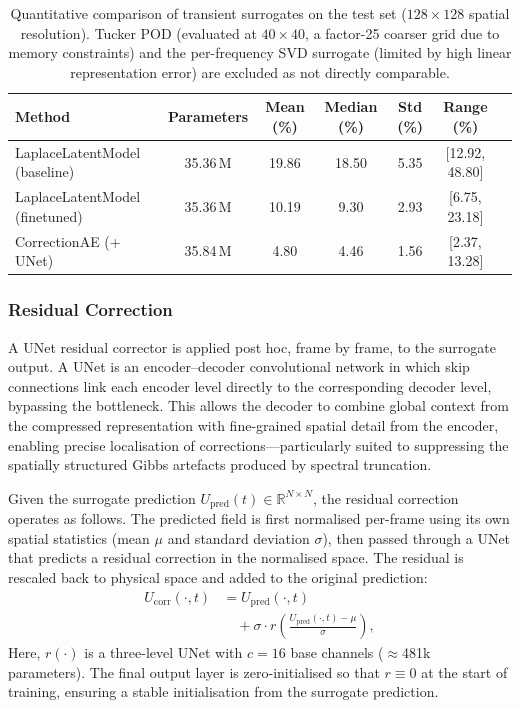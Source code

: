 \documentclass[a4paper, twocolumn]{article}
\newcommand{\R}{\mathbb{R}}
\begin{document}
\begin{table}[htbp]
    \centering
    \begin{tabular}{lcccccc}
        \toprule
        \textbf{Method} & \textbf{Parameters} & \textbf{Mean (\%)} & \textbf{Median (\%)} & \textbf{Std (\%)} & \textbf{Range (\%)} \\
        \midrule
        LaplaceLatentModel (baseline)     & 35.36\,M & 19.86 & 18.50 & 5.35 & [12.92, 48.80] \\
        LaplaceLatentModel (finetuned)    & 35.36\,M & 10.19 & 9.30  & 2.93 & [6.75, 23.18] \\
        CorrectionAE (+ UNet)             & 35.84\,M & 4.80  & 4.46  & 1.56 & [2.37, 13.28] \\
        \bottomrule
    \end{tabular}
    \caption{Quantitative comparison of transient surrogates on the test set ($128\times128$ spatial resolution). Tucker POD (evaluated at $40\times40$, a factor-25 coarser grid due to memory constraints) and the per-frequency SVD surrogate (limited by high linear representation error) are excluded as not directly comparable.}
    \label{tab:comparison}
\end{table}

\subsubsection{Residual Correction}

A UNet \cite{ronneberger2015unet} residual corrector is applied post hoc, frame by frame, to the surrogate output. A UNet is an encoder--decoder convolutional network in which skip connections link each encoder level directly to the corresponding decoder level, bypassing the bottleneck. This allows the decoder to combine global context from the compressed representation with fine-grained spatial detail from the encoder, enabling precise localisation of corrections—particularly suited to suppressing the spatially structured Gibbs artefacts produced by spectral truncation.

Given the surrogate prediction $U_{\mathrm{pred}}(t) \in \R^{N \times N}$, the residual correction operates as follows. The predicted field is first normalised per-frame using its own spatial statistics (mean $\mu$ and standard deviation $\sigma$), then passed through a UNet that predicts a residual correction in the normalised space. The residual is rescaled back to physical space and added to the original prediction:
\begin{equation}
\begin{split}
    U_{\mathrm{corr}}(\cdot,t) &= U_{\mathrm{pred}}(\cdot,t) \\
    &\quad + \sigma \cdot r\!\left(\frac{U_{\mathrm{pred}}(\cdot,t) - \mu}{\sigma}\right),
\end{split}
    \label{eq:correction}
\end{equation}
Here, $r(\cdot)$ is a three-level UNet with $c = 16$ base channels ($\approx$481k parameters). The final output layer is zero-initialised so that $r \equiv 0$ at the start of training, ensuring a stable initialisation from the surrogate prediction.
\end{document}
